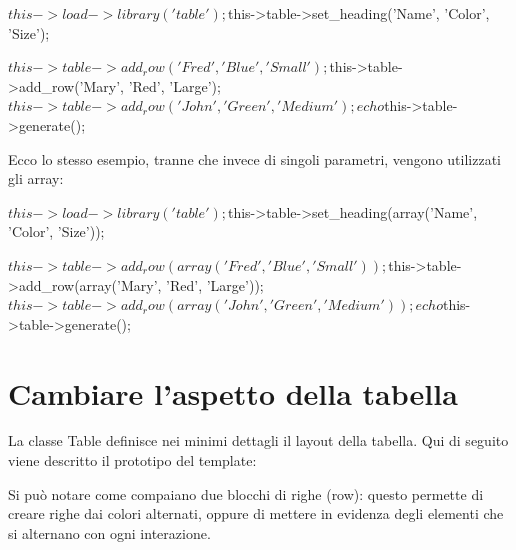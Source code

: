\begin{code}
$this->load->library('table');

$this->table->set_heading('Name', 'Color', 'Size');

$this->table->add_row('Fred', 'Blue', 'Small');
$this->table->add_row('Mary', 'Red', 'Large');
$this->table->add_row('John', 'Green', 'Medium');

echo $this->table->generate();
\end{code}

Ecco lo stesso esempio, tranne che invece di singoli parametri, vengono utilizzati gli array:

\begin{code}
$this->load->library('table');

$this->table->set_heading(array('Name', 'Color', 'Size'));

$this->table->add_row(array('Fred', 'Blue', 'Small'));
$this->table->add_row(array('Mary', 'Red', 'Large'));
$this->table->add_row(array('John', 'Green', 'Medium'));

echo $this->table->generate();
\end{code}

\section*{Cambiare l'aspetto della tabella}
La classe Table definisce nei minimi dettagli il layout della tabella. Qui di seguito viene descritto il prototipo del template:


Si può notare come compaiano due blocchi di righe (row): questo permette di creare righe dai colori alternati, oppure di mettere in evidenza degli elementi che si alternano con ogni interazione.

